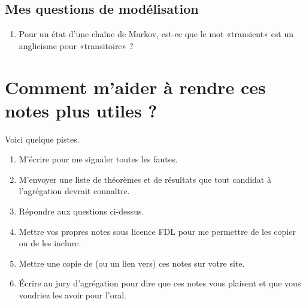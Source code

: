 \subsection{Mes questions de modélisation}

\begin{enumerate}
    \item
        Pour un état d'une chaîne de Markov, est-ce que le mot «transient» est un anglicisme pour «transitoire» ?
\end{enumerate}


\section{Comment m'aider à rendre ces notes plus utiles ?}

Voici quelque pistes.

\begin{enumerate}
    \item
        M'écrire pour me signaler toutes les fautes.
    \item
        M'envoyer une liste de théorèmes et de résultats que tout candidat à l'agrégation devrait connaître.
    \item
        Répondre aux questions ci-dessus.
    \item
        Mettre vos propres notes sous licence FDL pour me permettre de les copier ou de les inclure. 
    \item
        Mettre une copie de (ou un lien vers) ces notes sur votre site.
    \item
        Écrire au jury d'agrégation pour dire que ces notes vous plaisent et que vous voudriez les avoir pour l'oral.
\end{enumerate}

